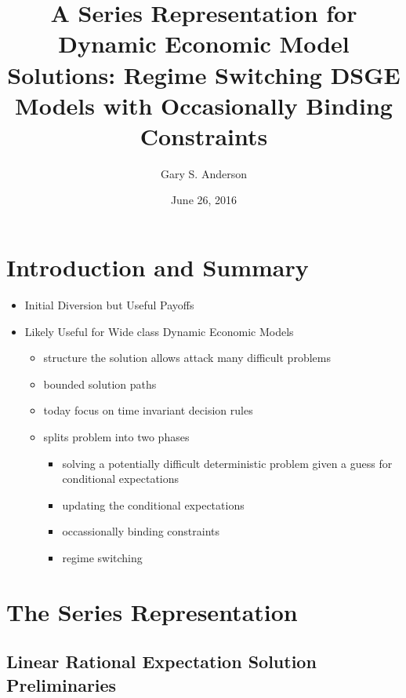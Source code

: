 \documentclass[tikz]{beamer}
\begin{document}
\title[A Series Representation  for Solving  Models]{A Series Representation for Dynamic Economic Model Solutions: Regime Switching DSGE Models with Occasionally Binding Constraints }


\author{Gary S. Anderson}
\date{June 26, 2016} 


\frame{\titlepage}

\section{Introduction and Summary}

 \begin{itemize}
 \item Initial Diversion but Useful Payoffs
 \item Likely Useful for Wide class Dynamic Economic Models
   \begin{itemize}
   \item structure the solution allows attack many difficult problems
   \item bounded solution paths
   \item today focus on time invariant decision rules 
   \item splits problem into two phases
     \begin{itemize}
     \item solving a potentially difficult deterministic problem given a guess for conditional expectations
     \item updating the conditional expectations
   \end{itemize}
   \begin{itemize}
     \item occassionally binding constraints
     \item regime switching
   \end{itemize}
\end{itemize}
\end{itemize}

\section{The Series Representation}


\subsection{Linear Rational Expectation Solution Preliminaries}
\end{document}
